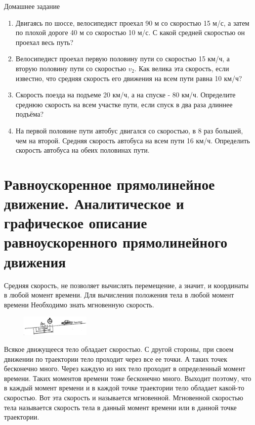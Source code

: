 \documentclass[a6paper, 11pt]{diss_4}
\renewcommand{\'}{\,'}
\begin{document}
\begin{center}
   Домашнее задание
\end{center}
\begin{enumerate}
\item Двигаясь по шоссе, велосипедист проехал 90 м со скоростью 15 м/с, а затем
по плохой дороге 40 м со скоростью 10 м/с. С какой средней скоростью он проехал
весь путь?

\item Велосипедист проехал первую половину пути со скоростью 15 км/ч, а вторую
половину пути со скоростью $v_2$. Как велика эта скорость, если известно, что
средняя скорость его движения на всем пути равна 10 км/ч?

\item Скорость поезда на подъеме 20 км/ч, а на спуске - 80 км/ч. Определите
среднюю скорость на всем участке пути, если спуск в два раза длиннее подъёма?

\item На первой половине пути автобус двигался со скоростью, в 8 раз большей,
чем на второй. Средняя скорость автобуса на всем пути 16 км/ч. Определить
скорость автобуса на обеих половинах пути.
\end{enumerate}

\section{Равноускоренное прямолинейное движение. Аналитическое и графическое
описание равноускоренного прямолинейного движения}

  Средняя скорость, не позволяет вычислять перемещение, а значит, и
координаты в любой момент времени. Для вычисления положения тела в любой момент
времени Необходимо знать мгновенную скорость.

\begin{figure}
\begin{center}
\includegraphics[width=0.3\textwidth]{img/img_10.eps}
\caption{}
\end{center}
\label{fig10}
\end{figure}


  Всякое движущееся тело обладает скоростью. С другой стороны, при своем
движении по траектории тело проходит через все ее точки. А таких точек
бесконечно много. Через каждую из них тело проходит в определенный момент
времени. Таких моментов времени тоже бесконечно много. Выходит поэтому, что в
каждый момент времени и в каждой точке траектории тело обладает какой-то
скоростью. Вот эта скорость и называется мгновенной. Мгновенной скоростью
тела называется скорость тела в данный момент времени или в данной точке
траектории.
\end{document}
